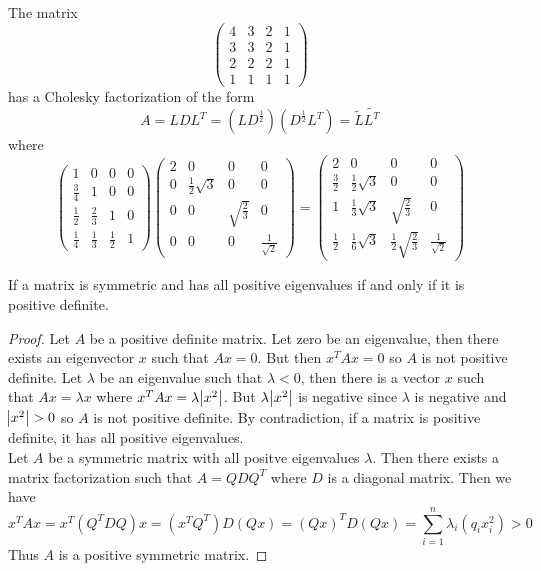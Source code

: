 \begin{example}
  The matrix
  \[ \begin{pmatrix}
       4 & 3 & 2 & 1\\
       3 & 3 & 2 & 1\\
       2 & 2 & 2 & 1\\
       1 & 1 & 1 & 1
     \end{pmatrix} \]
   has a Cholesky factorization of the form
   \[ A = LDL^{T} = (LD^{\frac{1}{2}})(D^{\frac{1}{2}}L^{T}) = \tilde{L}\tilde{L^{T}} \]
   where
   \[ \begin{pmatrix}
        1 & 0 & 0 & 0\\
        \frac{3}{4} & 1 & 0 & 0\\
        \frac{1}{2} & \frac{2}{3} & 1 & 0\\
        \frac{1}{4} & \frac{1}{3} & \frac{1}{2} & 1
      \end{pmatrix}
      \begin{pmatrix}
        2 & 0 & 0 & 0\\
        0 & \frac{1}{2}\sqrt{3} & 0 & 0\\
        0 & 0 & \sqrt{\frac{2}{3}} & 0\\
        0 & 0 & 0 & \frac{1}{\sqrt{2}}
      \end{pmatrix} = 
      \begin{pmatrix}
        2 & 0 & 0 & 0\\
        \frac{3}{2} & \frac{1}{2}\sqrt{3} & 0 & 0\\
        1 & \frac{1}{3}\sqrt{3} & \sqrt{\frac{2}{3}} & 0\\
        \frac{1}{2} & \frac{1}{6}\sqrt{3} & \frac{1}{2}\sqrt{\frac{2}{3}} & \frac{1}{\sqrt{2}}
      \end{pmatrix} \]
  \end{example}
  
  \begin{theorem}
    If a matrix is symmetric and has all positive eigenvalues if and only if it is positive definite.
    \begin{proof}
      Let \(A\) be a positive definite matrix. Let zero be an eigenvalue, then there exists an eigenvector \(x\) such that \(Ax = 0.\) But then \(x^{T}Ax = 0\) so \(A\) is not positive definite. Let \(\lambda\) be an eigenvalue such that \(\lambda<0\), then there is a vector \(x\) such that \(Ax = \lambda x\) where \(x^{T}Ax = \lambda\abs{x^{2}}\). But \(\lambda\abs{x^{2}}\) is negative since \(\lambda\) is negative and \(\abs{x^{2}}>0\) so \(A\) is not positive definite. By contradiction, if a matrix is positive definite, it has all positive eigenvalues.\\
      Let \(A\) be a symmetric matrix with all positve eigenvalues \(\lambda\). Then there exists a matrix factorization such that \(A = QDQ^{T}\) where \(D\) is a diagonal matrix. Then we have
      \[ x^{T}Ax = x^{T}(Q^{T}DQ)x = (x^{T}Q^{T})D(Qx) = (Qx)^{T}D(Qx) = \sum^{n}_{i=1}\lambda_{i}(q_{i}x_{i}^{2}) > 0\]
      Thus \(A\) is a positive symmetric matrix.
    \end{proof}
  \end{theorem}
  
